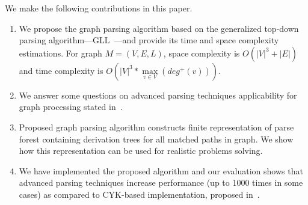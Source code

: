 \documentclass[sigconf]{acmart}
\begin{document}
We make the following contributions in this paper.
\begin{enumerate}
\item We propose the graph parsing algorithm based on the generalized top-down parsing algorithm---GLL~\cite{scott2010gll}---and provide its time and space complexity estimations. 
For graph $M=(V,E,L)$, space complexity is $O(|V|^3 + |E|)$ and time complexity is $O\left(|V|^3*\max\limits_{v \in V}\left(deg^+\left(v\right)\right)\right)$.
\item We answer some questions on advanced parsing techniques applicability for graph processing stated in~\cite{Hellings16}.
\item Proposed graph parsing algorithm constructs finite representation of parse forest containing derivation trees for all matched paths in graph. We show how this representation can be used for realistic problems solving.
\item We have implemented the proposed algorithm and our evaluation shows that advanced parsing techniques increase performance (up to 1000 times in some cases) as compared to CYK-based implementation, proposed in~\cite{CFGonRDF}.
\end{enumerate}











 
\end{document}
